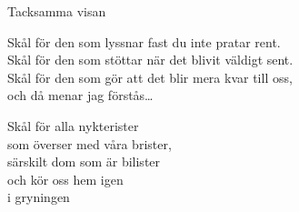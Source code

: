 \begin{song}{Tacksamma visan}

	
	
	Skål för den som lyssnar fast du inte pratar rent.\\
	Skål för den som stöttar när det blivit väldigt sent.\\
	Skål för den som gör att det blir mera kvar till oss,\\
	och då menar jag förstås\dots

	Skål för alla nykterister\\
	som överser med våra brister,\\
	särskilt dom som är bilister\\
	och kör oss hem igen\\
	i gryningen

	
\end{song}
